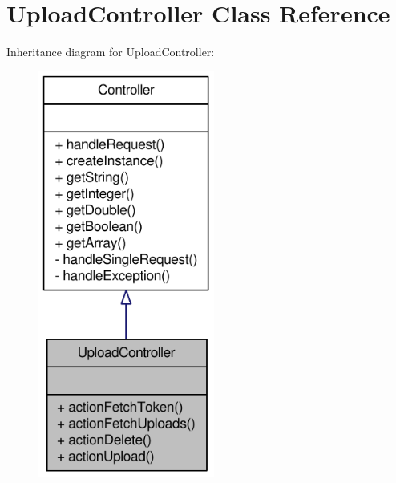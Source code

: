 \hypertarget{classUploadController}{
\section{UploadController Class Reference}
\label{classUploadController}
}


Inheritance diagram for UploadController:\nopagebreak
\begin{figure}[H]
\begin{center}
\leavevmode
\includegraphics[width=164pt]{classUploadController__inherit__graph}
\end{center}
\end{figure}


